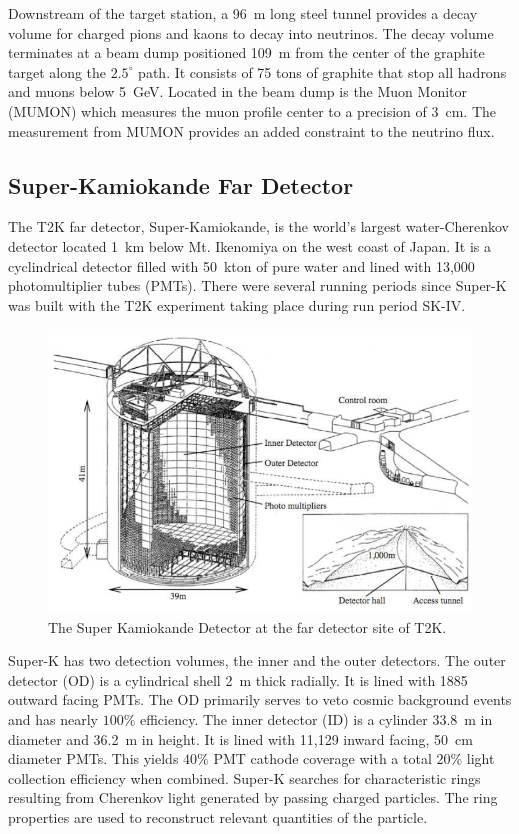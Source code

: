 Downstream of the target station, a 96~m long steel tunnel provides a
decay volume for charged pions and kaons to decay into neutrinos. The
decay volume terminates at a beam dump positioned 109~m from the
center of the graphite target along the $2.5^{\circ}$ path. It
consists of 75 tons of graphite that stop all hadrons and muons below
5~GeV. Located in the beam dump is the Muon Monitor (MUMON) which
measures the muon profile center to a precision of 3~cm. The
measurement from MUMON provides an added constraint to the neutrino
flux. 

\subsection{Super-Kamiokande Far Detector}

The T2K far detector, Super-Kamiokande, is the world's largest
water-Cherenkov detector located 1~km below Mt. Ikenomiya on the west
coast of Japan. It is a cyclindrical detector filled with 50~kton of
pure water and lined with 13,000 photomultiplier tubes (PMTs). There
were several running periods since Super-K was built with the T2K
experiment taking place during run period SK-IV. 

\begin{figure}
\begin{center}
\includegraphics[width=6in]{./Figures/superk.png}
\end{center}
\caption{The Super Kamiokande Detector at the far detector site of
  T2K.}
\label{fig:superk}
\end{figure}

Super-K has two detection volumes, the inner and the outer
detectors. The outer detector (OD) is a cylindrical shell 2~m thick
radially. It is lined with 1885 outward facing
PMTs. The OD primarily serves to veto cosmic background events and
has nearly $100\%$ efficiency. The inner detector (ID) is a cylinder 33.8~m in diameter and 36.2~m in height. It is lined
with 11,129 inward facing, 50~cm diameter PMTs. This yields $40\%$ PMT
cathode coverage with a total $20\%$ light collection efficiency
when combined. Super-K searches for characteristic rings resulting
from Cherenkov light generated by passing charged particles. The ring
properties are used to reconstruct relevant quantities of the
particle. 

